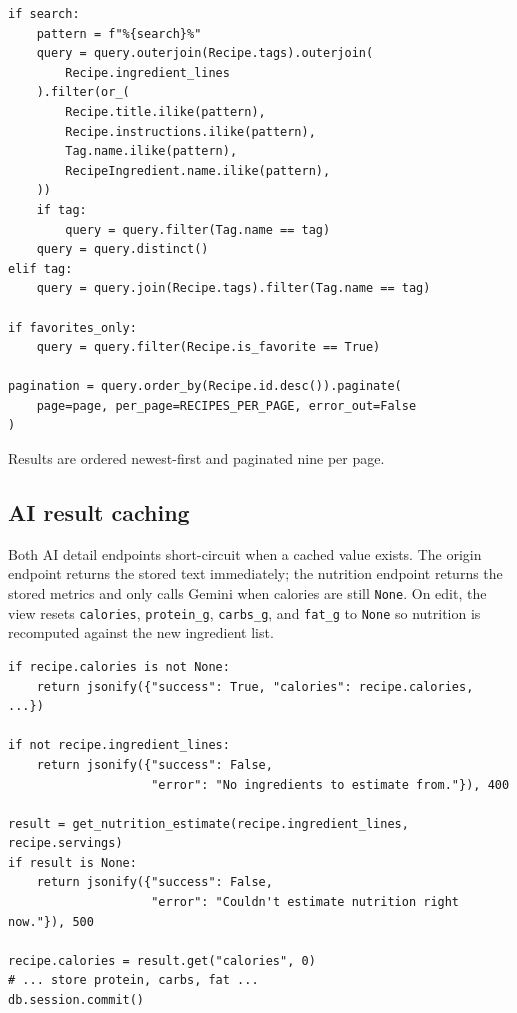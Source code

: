 \documentclass[11pt,a4paper]{article}
\newcommand{\code}[1]{\texttt{#1}}
\begin{document}
\begin{lstlisting}[caption={Search query construction in \texttt{home()}}]
if search:
    pattern = f"%{search}%"
    query = query.outerjoin(Recipe.tags).outerjoin(
        Recipe.ingredient_lines
    ).filter(or_(
        Recipe.title.ilike(pattern),
        Recipe.instructions.ilike(pattern),
        Tag.name.ilike(pattern),
        RecipeIngredient.name.ilike(pattern),
    ))
    if tag:
        query = query.filter(Tag.name == tag)
    query = query.distinct()
elif tag:
    query = query.join(Recipe.tags).filter(Tag.name == tag)

if favorites_only:
    query = query.filter(Recipe.is_favorite == True)

pagination = query.order_by(Recipe.id.desc()).paginate(
    page=page, per_page=RECIPES_PER_PAGE, error_out=False
)
\end{lstlisting}

Results are ordered newest-first and paginated nine per page.

\subsection{AI result caching}
Both AI detail endpoints short-circuit when a cached value exists. The origin
endpoint returns the stored text immediately; the nutrition endpoint returns the
stored metrics and only calls Gemini when calories are still \code{None}. On
edit, the view resets \code{calories}, \code{protein\_g}, \code{carbs\_g}, and
\code{fat\_g} to \code{None} so nutrition is recomputed against the new
ingredient list.

\begin{lstlisting}[caption={Nutrition caching logic (abridged)}]
if recipe.calories is not None:
    return jsonify({"success": True, "calories": recipe.calories, ...})

if not recipe.ingredient_lines:
    return jsonify({"success": False,
                    "error": "No ingredients to estimate from."}), 400

result = get_nutrition_estimate(recipe.ingredient_lines, recipe.servings)
if result is None:
    return jsonify({"success": False,
                    "error": "Couldn't estimate nutrition right now."}), 500

recipe.calories = result.get("calories", 0)
# ... store protein, carbs, fat ...
db.session.commit()
\end{lstlisting}

\end{document}
